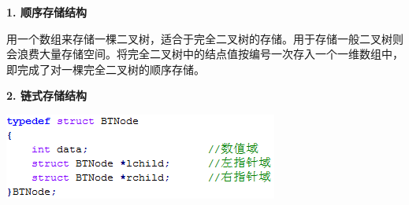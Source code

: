 {\textbf{1. 顺序存储结构}}

{用一个数组来存储一棵二叉树，适合于完全二叉树的存储。用于存储一般二叉树则会浪费大量存储空间。将完全二叉树中的结点值按编号一次存入一个一维数组中，即完成了对一棵完全二叉树的顺序存储。}

{\textbf{2. 链式存储结构}}

\includegraphics[width=3.54167in,height=1.11458in]{png-jpeg-pics/BEFD7EF20BBECAF465B5B19292AE6ACC.png}
